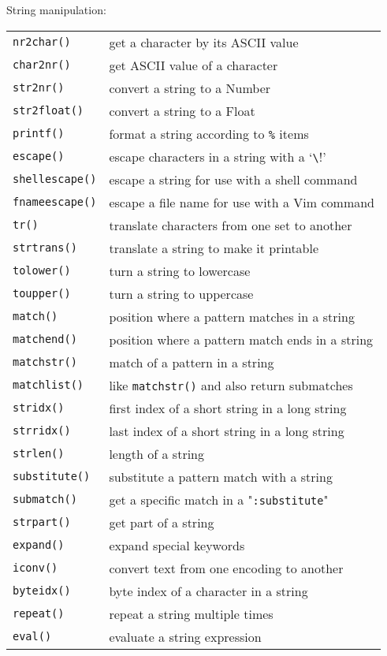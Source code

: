 String manipulation:
\label{string-functions}
\begin{center} \begin{tabular}{l l}
				\verb!nr2char()! & get a character by its ASCII value \\
				\verb!char2nr()! & get ASCII value of a character \\
				\verb!str2nr()! & convert a string to a Number \\
				\verb!str2float()! & convert a string to a Float \\
				\verb!printf()! & format a string according to \verb!%! items \\
				\verb!escape()! & escape characters in a string with a `\verb!\!' \\
				\verb!shellescape()! & escape a string for use with a shell command \\
				\verb!fnameescape()! & escape a file name for use with a Vim command \\
				\verb!tr()! & translate characters from one set to another \\
				\verb!strtrans()! & translate a string to make it printable \\
				\verb!tolower()! & turn a string to lowercase \\
				\verb!toupper()! & turn a string to uppercase \\
				\verb!match()! & position where a pattern matches in a string \\
				\verb!matchend()! & position where a pattern match ends in a string \\
				\verb!matchstr()! & match of a pattern in a string \\
				\verb!matchlist()! & like \verb!matchstr()! and also return submatches \\
				\verb!stridx()! & first index of a short string in a long string \\
				\verb!strridx()! & last index of a short string in a long string \\
				\verb!strlen()! & length of a string \\
				\verb!substitute()! & substitute a pattern match with a string \\
				\verb!submatch()! & get a specific match in a "\verb!:substitute!" \\
				\verb!strpart()! & get part of a string \\
				\verb!expand()! & expand special keywords \\
				\verb!iconv()! & convert text from one encoding to another \\
				\verb!byteidx()! & byte index of a character in a string \\
				\verb!repeat()! & repeat a string multiple times \\
				\verb!eval()! & evaluate a string expression \\
\end{tabular} \end{center}

